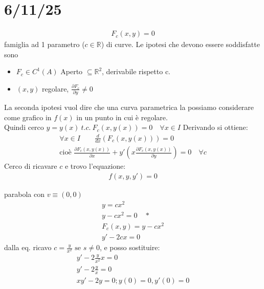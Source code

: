 \documentclass[a4paper, oneside]{article}
\begin{document}
\section{6/11/25}
\begin{definition}
    \begin{gather*}
        F_c(x,y) = 0
    \end{gather*}
    famiglia ad 1 parametro ($c \in \mathbb{R}$) di curve.
    Le ipotesi che devono essere soddisfatte sono
    \begin{itemize}
        \item $F_c \in C^1(A)$ Aperto $\subseteq \mathbb{R}^2$, derivabile rispetto c.\\
        \item $(x,y)$ regolare, $\frac{\partial F_c}{\partial y} \neq 0$
    \end{itemize}
    La seconda ipotesi vuol dire che una curva parametrica la possiamo considerare come grafico in $f(x)$ in un punto in cui è regolare.\\
    Quindi cerco $y = y(x) \ t.c. \ \boxed{F_c(x,y(x)) = 0} \quad \forall x \in I$
    Derivando si ottiene:
    \begin{gather*}
        \forall x \in I \qquad \frac{d}{dx}(F_c (x,y(x))) = 0\\
        \text{cioè } \boxed{\frac{\partial F_c(x,y(x))}{\partial x} + y'(x \frac{\partial F_c(x,y(x))}{\partial y}) = 0} \quad \forall c
    \end{gather*}
    Cerco di ricavare $c$ e trovo l'equazione:
    \begin{gather*}
        f(x,y,y') = 0
    \end{gather*}
\end{definition}
\begin{example}
    parabola con $v \equiv (0,0)$
    \begin{gather*}
        y = cx^2\\
        y-cx^2 = 0 \quad{*}\\
        F_c(x,y) = y-cx^2 \\
        y' -2cx = 0
    \end{gather*}
    dalla eq. \fbox{*} ricavo $c = \frac{y}{x^2} \text{ se } s \neq 0$, e posso sostituire:
    \begin{gather*}
        y' -2\frac{y}{x^2} x = 0\\
        y' - 2 \frac{y}{x} = 0\\
        xy' -2y = 0; y(0) = 0 , y'(0) = 0 
    \end{gather*}
\end{example}
\end{document}
